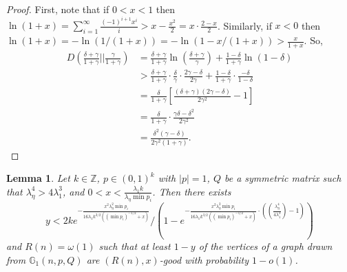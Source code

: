 \documentclass[11pt]{article}
\newcommand{\gss}{\mathbb{G}_1}
\newcommand{\1}{\mathbb{1}}
\newtheorem{lemma}{Lemma}
\begin{document}
\begin{proof}
First, note that if $0<x<1$ then $\ln(1+x)=\sum_{i=1}^\infty \frac{(-1)^{i+1}x^i}{i}>x-\frac{x^2}{2}=x\cdot\frac{2-x}{2}$. Similarly, if $x<0$ then $\ln(1+x)=-\ln(1/(1+x))=-\ln(1-x/(1+x))>\frac{x}{1+x}$. So,
\begin{align*}
D\left(\frac{\delta+\gamma}{1+\gamma}||\frac{\gamma}{1+\gamma}\right)&=\frac{\delta+\gamma}{1+\gamma}\ln\left(\frac{\delta+\gamma}{\gamma}\right)+\frac{1-\delta}{1+\gamma}\ln(1-\delta)\\
&>\frac{\delta+\gamma}{1+\gamma}\cdot\frac{\delta}{\gamma}\cdot\frac{2\gamma-\delta}{2\gamma}+\frac{1-\delta}{1+\gamma}\cdot\frac{-\delta}{1-\delta}\\
&=\frac{\delta}{1+\gamma}\left[ \frac{(\delta+\gamma)(2\gamma-\delta)}{2\gamma^2}-1\right]\\
&=\frac{\delta}{1+\gamma}\cdot\frac{\gamma\delta-\delta^2}{2\gamma^2}\\
&=\frac{\delta^2(\gamma-\delta)}{2\gamma^2(1+\gamma)}.
\end{align*}
\end{proof}

\begin{lemma}
Let $k\in \mathbb{Z}$, $p\in (0,1)^k$ with $|p|=1$, $Q$ be a symmetric matrix such that $\lambda_{\eta}^4>4\lambda_1^3$, and $0<x<\frac{\lambda_1k}{\lambda_{\eta}\min p_i}$. Then there exists \[ y<2ke^{-\frac{x^2\lambda_{\eta}^2\min p_i}{16\lambda_1 k^{3/2}((\min p_i)^{-1/2}+x)}}/\left(1-e^{-\frac{x^2\lambda_{\eta}^2\min p_i}{16\lambda_1k^{3/2}((\min p_i)^{-1/2}+x)}\cdot((\frac{\lambda_{\eta}^4}{4\lambda_1^3})-1)}\right)\] and $R(n)= \omega(1)$  such that at least $1-y$ of the vertices of a graph drawn from $\gss(n,p,Q)$ are $(R(n),x)$-good with probability $1-o(1)$.
\end{lemma}
\end{document}
